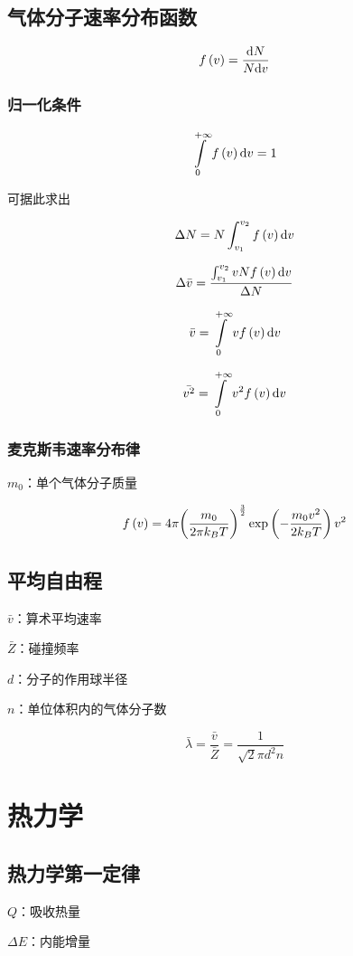 \documentclass{article}
\begin{document}
\subsection{气体分子速率分布函数}

\[f\left(v\right)=\frac{\mathrm d N}{N\mathrm d v}\]

\subsubsection{归一化条件}

\[\int\limits_0^{+\infty}f\left(v\right)\mathrm d v=1\]

可据此求出

\[\Delta N=N\int_{v_1}^{v_2}f\left(v\right)\mathrm d v\]

\[\Delta\bar v=\dfrac{\int_{v_1}^{v_2}vNf\left(v\right)\mathrm d v}{\Delta N}\]

\[\bar v=\int\limits_0^{+\infty}vf\left(v\right)\mathrm d v\]

\[\bar{v^2}=\int\limits_0^{+\infty}v^2f\left(v\right)\mathrm d v\]

\subsubsection{麦克斯韦速率分布律}

$m_0$：单个气体分子质量

\[f\left(v\right)=4\pi{\left(\frac{m_0}{2\pi k_BT}\right)}^{\frac32}\exp\left(-\frac{m_0v^2}{2k_BT}\right)v^2\]

\subsection{平均自由程}

$\bar v$：算术平均速率

$\bar Z$：碰撞频率

$d$：分子的作用球半径

$n$：单位体积内的气体分子数

\[\bar\lambda=\frac{\bar v}{\bar Z}=\frac1{\sqrt2\pi d^2n}\]

\section{热力学}

\subsection{热力学第一定律}

$Q$：吸收热量

$\Delta E$：内能增量
\end{document}
